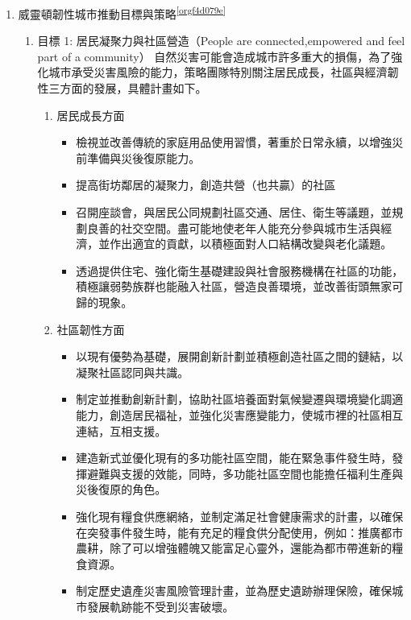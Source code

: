 \documentclass[a4paper,12pt]{article}
\begin{document}
\begin{enumerate}
\item 威靈頓韌性城市推動目標與策略\textsuperscript{\ref{orgf4d079e}}
\label{sec:orgdec0714}
\begin{enumerate}
\item 目標 1: 居民凝聚力與社區營造（People are connected,empowered and feel part of a community）
\label{sec:org953702f}
自然災害可能會造成城市許多重大的損傷，為了強化城市承受災害風險的能力，策略團隊特別關注居民成長，社區與經濟韌性三方面的發展，具體計畫如下。\\
\begin{enumerate}
\item 居民成長方面
\label{sec:org24d4d1d}
\begin{itemize}
\item 檢視並改善傳統的家庭用品使用習慣，著重於日常永續，以增強災前準備與災後復原能力。\\
\item 提高街坊鄰居的凝聚力，創造共營（也共贏）的社區\\
\item 召開座談會，與居民公同規劃社區交通、居住、衛生等議題，並規劃良善的社交空間。盡可能地使老年人能充分參與城市生活與經濟，並作出適宜的貢獻，以積極面對人口結構改變與老化議題。\\
\item 透過提供住宅、強化衛生基礎建設與社會服務機構在社區的功能，積極讓弱勢族群也能融入社區，營造良善環境，並改善街頭無家可歸的現象。\\
\end{itemize}
\item 社區韌性方面
\label{sec:org14ed347}
\begin{itemize}
\item 以現有優勢為基礎，展開創新計劃並積極創造社區之間的鏈結，以凝聚社區認同與共識。\\
\item 制定並推動創新計劃，協助社區培養面對氣候變遷與環境變化調適能力，創造居民福祉，並強化災害應變能力，使城市裡的社區相互連結，互相支援。\\
\item 建造新式並優化現有的多功能社區空間，能在緊急事件發生時，發揮避難與支援的效能，同時，多功能社區空間也能擔任福利生產與災後復原的角色。\\
\item 強化現有糧食供應網絡，並制定滿足社會健康需求的計畫，以確保在突發事件發生時，能有充足的糧食供分配使用，例如：推廣都市農耕，除了可以增強體魄又能富足心靈外，還能為都市帶進新的糧食資源。\\
\item 制定歷史遺產災害風險管理計畫，並為歷史遺跡辦理保險，確保城市發展軌跡能不受到災害破壞。\\

\end{itemize}
\end{enumerate}
\end{enumerate}
\end{enumerate}
\end{document}
